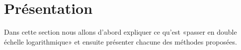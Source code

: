 \section{Présentation}
\label{sec:approx-lin/pres}

Dans cette section nous allons d'abord expliquer ce qu'est
«passer en double échelle logarithmique» et ensuite présenter
chacune des méthodes proposées.


